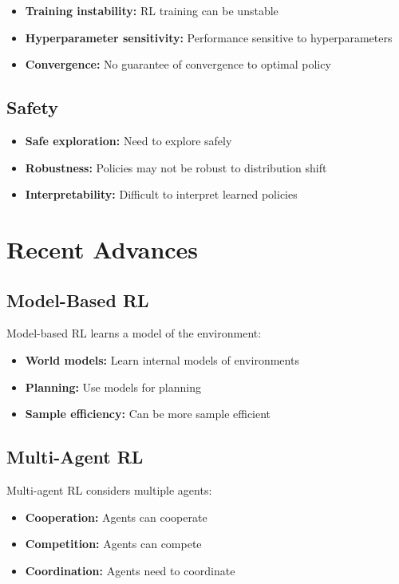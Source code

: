 \begin{itemize}
    \item \textbf{Training instability:} RL training can be unstable
    \item \textbf{Hyperparameter sensitivity:} Performance sensitive to hyperparameters
    \item \textbf{Convergence:} No guarantee of convergence to optimal policy
\end{itemize}

\subsection{Safety}

\begin{itemize}
    \item \textbf{Safe exploration:} Need to explore safely
    \item \textbf{Robustness:} Policies may not be robust to distribution shift
    \item \textbf{Interpretability:} Difficult to interpret learned policies
\end{itemize}

\section{Recent Advances}

\subsection{Model-Based RL}

Model-based RL learns a model of the environment:
\begin{itemize}
    \item \textbf{World models:} Learn internal models of environments
    \item \textbf{Planning:} Use models for planning
    \item \textbf{Sample efficiency:} Can be more sample efficient
\end{itemize}

\subsection{Multi-Agent RL}

Multi-agent RL considers multiple agents:
\begin{itemize}
    \item \textbf{Cooperation:} Agents can cooperate
    \item \textbf{Competition:} Agents can compete
    \item \textbf{Coordination:} Agents need to coordinate
\end{itemize}

